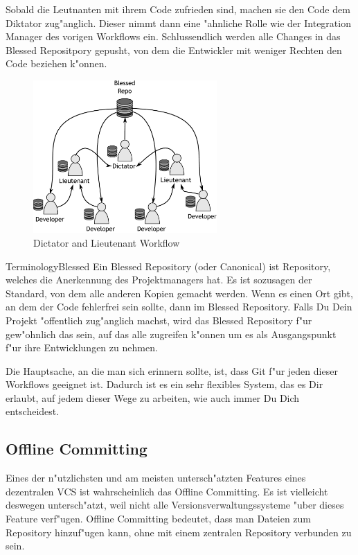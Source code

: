 Sobald die Leutnanten mit ihrem Code zufrieden sind, machen sie den Code dem Diktator zug"anglich. Dieser nimmt dann eine "ahnliche Rolle wie der Integration
Manager des vorigen Workflows ein. Schlussendlich werden alle Changes in das Blessed Repositpory gepusht, von dem die Entwickler mit weniger Rechten den Code beziehen
k"onnen.

\begin{figure}[bt]
	\centering
	\includegraphics[width=7cm]{images/f-w1-d3.pdf}
	\caption{Dictator and Lieutenant Workflow}
\end{figure}

\begin{callout}{Terminology}{Blessed}
Ein Blessed Repository (oder Canonical) ist Repository, welches die Anerkennung des Projektmanagers hat. Es ist sozusagen der Standard, von dem alle anderen Kopien
gemacht werden. Wenn es einen Ort gibt, an dem der Code fehlerfrei sein sollte, dann im Blessed Repository. Falls Du Dein Projekt "offentlich zug"anglich machst,
wird das Blessed Repository f"ur gew"ohnlich das sein, auf das alle zugreifen k"onnen um es als Ausgangspunkt f"ur ihre Entwicklungen zu nehmen.
\end{callout}

Die Hauptsache, an die man sich erinnern sollte, ist, dass Git f"ur jeden dieser Workflows geeignet ist. Dadurch ist es ein sehr flexibles System, das es Dir
erlaubt, auf jedem dieser Wege zu arbeiten, wie auch immer Du Dich entscheidest. 

\subsection{Offline Committing}

Eines der n"utzlichsten und am meisten untersch"atzten Features eines dezentralen VCS ist wahrscheinlich das Offline Committing. Es ist vielleicht deswegen
untersch"atzt, weil nicht alle Versionsverwaltungssysteme "uber dieses Feature verf"ugen. Offline Committing bedeutet, dass man Dateien zum Repository hinzuf"ugen
kann, ohne mit einem zentralen Repository verbunden zu sein.

